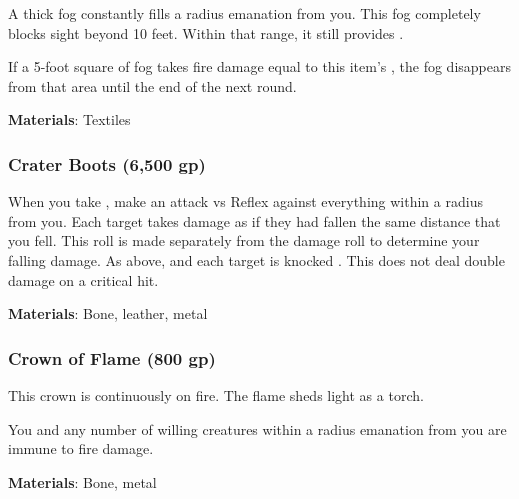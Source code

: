 A thick fog constantly fills a \areamed radius emanation from you.
This fog completely blocks sight beyond 10 feet.
Within that range, it still provides \concealment.

If a 5-foot square of fog takes fire damage equal to this item's , the fog disappears from that area until the end of the next round.



\vspace{0.25em}
\textbf{Materials}: Textiles


\lowercase{\hypertarget{item:Crater Boots}{}}\label{item:Crater Boots}
\hypertarget{item:Crater Boots}{\subsubsection{Crater Boots\hfill{} (6,500 gp)}}

When you take , make an attack vs Reflex against everything within a \areasmall radius from you.
\hit Each target takes damage as if they had fallen the same distance that you fell.
This roll is made separately from the damage roll to determine your falling damage.
\crit As above, and each target is knocked .
This does not deal double damage on a critical hit.



\vspace{0.25em}
\textbf{Materials}: Bone, leather, metal


\lowercase{\hypertarget{item:Crown of Flame}{}}\label{item:Crown of Flame}
\hypertarget{item:Crown of Flame}{\subsubsection{Crown of Flame\hfill{} (800 gp)}}

This crown is continuously on fire.
The flame sheds light as a torch.

You and any number of willing creatures within a \arealarge radius emanation from you are immune to fire damage.



\vspace{0.25em}
\textbf{Materials}: Bone, metal


